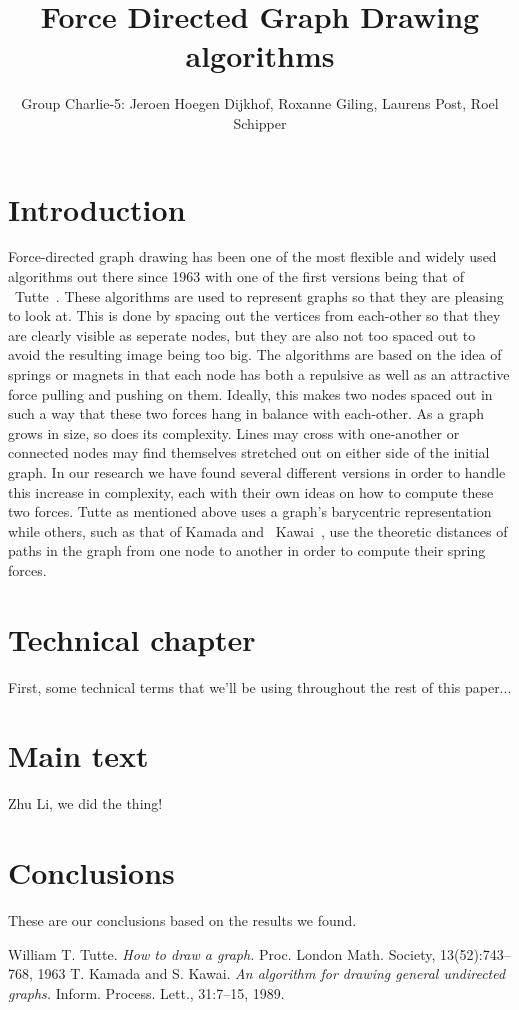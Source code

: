 \documentclass[a4paper,12pt,twoside]{article}
\begin{document}
\title{Force Directed Graph Drawing algorithms}
\author{Group Charlie-5: Jeroen Hoegen Dijkhof, Roxanne Giling, Laurens Post, Roel Schipper}
\newpage
\tableofcontents
\newpage
\section{Introduction}
Force-directed graph drawing has been one of the most flexible and widely used algorithms out there since 1963 with one of the first versions being that of ~Tutte~\cite{Tutte}. These algorithms are used to represent graphs so that they are pleasing to look at. This is done by spacing out the vertices from each-other so that they are clearly visible as seperate nodes, but they are also not too spaced out to avoid the resulting image being too big. The algorithms are based on the idea of springs or magnets in that each node has both a repulsive as well as an attractive force pulling and pushing on them. Ideally, this makes two nodes spaced out in such a way that these two forces hang in balance with each-other. As a graph grows in size, so does its complexity. Lines may cross with one-another or connected nodes may find themselves stretched out on either side of the initial graph. In our research we have found several different versions in order to handle this increase in complexity, each with their own ideas on how to compute these two forces. Tutte as mentioned above uses a graph's barycentric representation while others, such as that of Kamada and ~Kawai~\cite{Kawai}, use the theoretic distances of paths in the graph from one node to another in order to compute their spring forces.
\section{Technical chapter}
First, some technical terms that we'll be using throughout the rest of this paper...
\section{Main text}
Zhu Li, we did the thing!
\section{Conclusions}
These are our conclusions based on the results we found.
\begin{thebibliography}{99}
William T. Tutte. \emph{How to draw a graph.} Proc. London Math. Society, 13(52):743–768, 1963
T. Kamada and S. Kawai. \emph{An algorithm for drawing general undirected graphs.} Inform. Process. Lett., 31:7–15, 1989.
\end{thebibliography}
\end{document}
